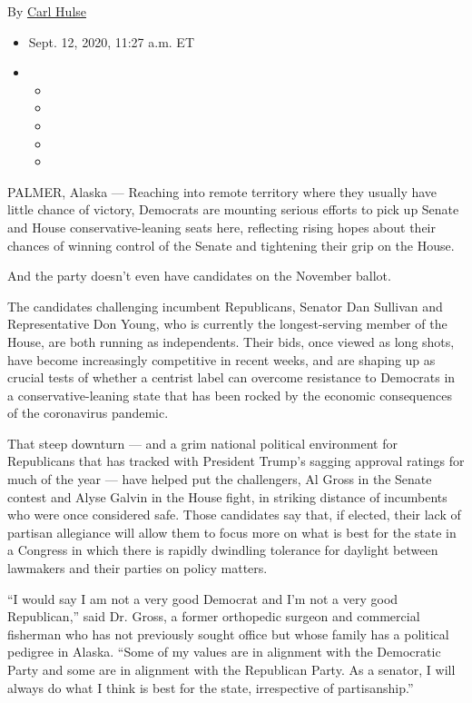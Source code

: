 By \href{https://www.nytimes3xbfgragh.onion/by/carl-hulse}{Carl Hulse}

\begin{itemize}
\item
  Sept. 12, 2020, 11:27 a.m. ET
\item
  \begin{itemize}
  \item
  \item
  \item
  \item
  \item
  \end{itemize}
\end{itemize}

PALMER, Alaska --- Reaching into remote territory where they usually
have little chance of victory, Democrats are mounting serious efforts to
pick up Senate and House conservative-leaning seats here, reflecting
rising hopes about their chances of winning control of the Senate and
tightening their grip on the House.

And the party doesn't even have candidates on the November ballot.

The candidates challenging incumbent Republicans, Senator Dan Sullivan
and Representative Don Young, who is currently the longest-serving
member of the House, are both running as independents. Their bids, once
viewed as long shots, have become increasingly competitive in recent
weeks, and are shaping up as crucial tests of whether a centrist label
can overcome resistance to Democrats in a conservative-leaning state
that has been rocked by the economic consequences of the coronavirus
pandemic.

That steep downturn --- and a grim national political environment for
Republicans that has tracked with President Trump's sagging approval
ratings for much of the year --- have helped put the challengers, Al
Gross in the Senate contest and Alyse Galvin in the House fight, in
striking distance of incumbents who were once considered safe. Those
candidates say that, if elected, their lack of partisan allegiance will
allow them to focus more on what is best for the state in a Congress in
which there is rapidly dwindling tolerance for daylight between
lawmakers and their parties on policy matters.

``I would say I am not a very good Democrat and I'm not a very good
Republican,'' said Dr. Gross, a former orthopedic surgeon and commercial
fisherman who has not previously sought office but whose family has a
political pedigree in Alaska. ``Some of my values are in alignment with
the Democratic Party and some are in alignment with the Republican
Party. As a senator, I will always do what I think is best for the
state, irrespective of partisanship.''

